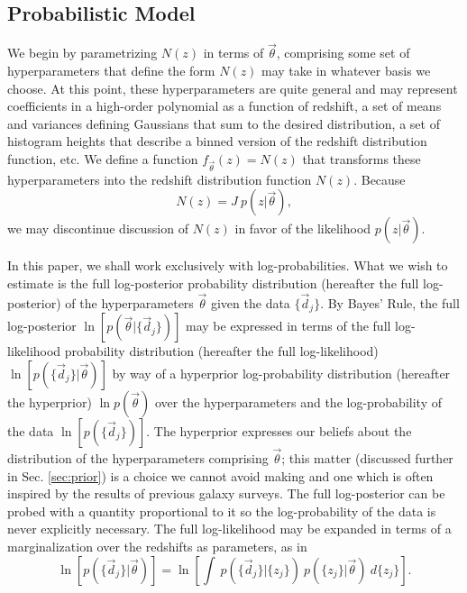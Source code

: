 \documentclass[preprint]{aastex}
\begin{document}
%
\clearpage
\subsection{Probabilistic Model}
\label{sec:prob}

We begin by parametrizing $N(z)$ in terms of $\vec{\theta}$, comprising some 
set of hyperparameters that define the form $N(z)$ may take in whatever basis 
we choose.  At this point, these hyperparameters are quite general and may 
represent coefficients in a high-order polynomial as a function of redshift, a 
set of means and variances defining Gaussians that sum to the desired 
distribution, a set of histogram heights that describe a binned version of the 
redshift distribution function, etc.  We define a function 
$f_{\vec{\theta}}(z)=N(z)$ that transforms these hyperparameters into the 
redshift distribution function $N(z)$.  Because 
\begin{equation}\label{eq:definition} N(z)=J\ p(z|\vec{\theta}),\end{equation} 
we may discontinue discussion of $N(z)$ in favor of the likelihood 
$p(z|\vec{\theta})$.

In this paper, we shall work exclusively with log-probabilities.  What we wish 
to estimate is the full log-posterior probability distribution (hereafter the 
full log-posterior) of the hyperparameters $\vec{\theta}$ given the data 
$\{\vec{d}_{j}\}$.  By Bayes' Rule, the full log-posterior 
$\ln[p(\vec{\theta}|\{\vec{d}_{j}\})]$ may be expressed in terms of the full 
log-likelihood probability distribution (hereafter the full log-likelihood) 
$\ln[p(\{\vec{d}_{j}\}|\vec{\theta})]$ by way of a hyperprior log-probability 
distribution (hereafter the hyperprior) $\ln p(\vec{\theta})$ over the 
hyperparameters and the log-probability of the data $\ln[p(\{\vec{d}_{j}\})]$.  
The hyperprior expresses our beliefs about the distribution of the 
hyperparameters comprising $\vec{\theta}$; this matter (discussed further in 
Sec. \ref{sec:prior}) is a choice we cannot avoid making and one which is often 
inspired by the results of previous galaxy surveys.  The full log-posterior can 
be probed with a quantity proportional to it so the log-probability of the data 
is never explicitly necessary.  The full log-likelihood may be expanded in 
terms of a marginalization over the redshifts as parameters, as in 
\begin{equation}\label{eq:marginalize} \ln[p(\{\vec{d}_{j}\}|\vec{\theta})] = 
\ln\left[\int\ p(\{\vec{d}_{j}\}|\{z_{j}\})\ p(\{z_{j}\}|\vec{\theta})\ 
d\{z_{j}\}\right].\end{equation}
\end{document}
